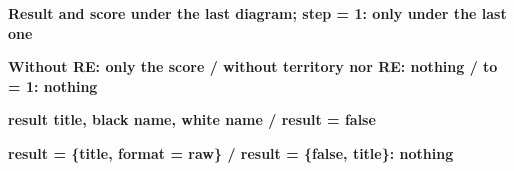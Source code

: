 \documentclass{article}
\newcommand\case[1]{\par\medskip\noindent\textbf{#1}\par\nopagebreak}
\begin{document}

\case{Result and score under the last diagram; step = 1: only under the last one}

\case{Without RE: only the score / without territory nor RE: nothing / to = 1: nothing}

\case{result title, black name, white name / result = false}

\case{result = \{title, format = raw\} / result = \{false, title\}: nothing}
\end{document}
